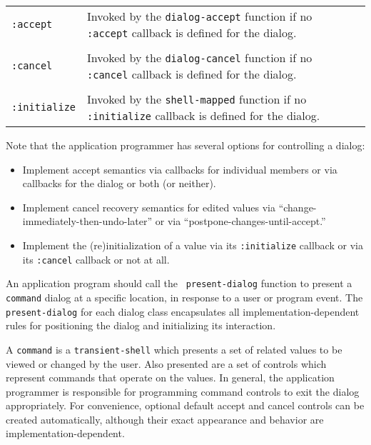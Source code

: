 \begin{center}
\begin{tabular}[t]{lp{5in}}
{\tt :accept} & Invoked by the {\tt dialog-accept} function if no {\tt
:accept} callback is defined for the dialog. \\
\\	
{\tt :cancel} & Invoked by the {\tt dialog-cancel} function if no {\tt
:cancel} callback is defined for the dialog.\\ 
\\
{\tt :initialize} & Invoked by the {\tt shell-mapped} function if no {\tt
:initialize} callback is defined for the dialog.\\
\end{tabular}
\end{center}


Note that the application programmer has several options for controlling a
dialog: 
\begin{itemize}
\item Implement accept semantics via callbacks for individual members or
        via callbacks for the dialog or both (or neither).

\item Implement cancel recovery semantics for edited values via
        ``change-immediately-then-undo-later'' or via ``postpone-changes-until-accept.''

\item Implement the (re)initialization of a value via its {\tt :initialize}
callback or via its  {\tt :cancel} callback or not at all.

\end{itemize}
 
An application program should call the {\tt
present-dialog} function  to present a {\tt
command} dialog at a specific location, in response to a user or program event.
The {\tt present-dialog} for each dialog class encapsulates all
implementation-dependent rules for positioning the dialog and initializing its
interaction.


A {\tt command} is a {\tt transient-shell} which presents a set of related
values to be viewed or changed by the user.  Also presented are a set of
controls which represent commands that operate on the values.  In general, the
application programmer is responsible for programming command controls to exit
the dialog appropriately.  For convenience, optional default accept and cancel
controls can be created automatically, although their exact appearance and
behavior are implementation-dependent. 

